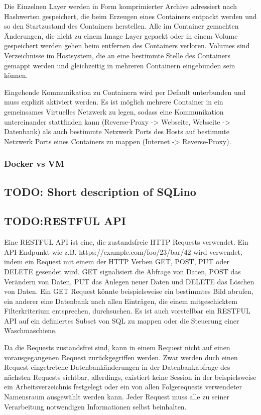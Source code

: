 Die Einzelnen Layer werden in Form komprimierter Archive adressiert nach
Hashwerten gespeichert, die beim Erzeugen eines Containers entpackt werden und
so den Startzustand des Containers herstellen. Alle im Container gemachten
Änderungen, die nicht zu einem Image Layer gepackt oder in einem Volume
gespeichert werden gehen beim entfernen des Containers verloren. Volumes sind
Verzeichnisse im Hostsystem, die an eine bestimmte Stelle des Containers gemappt
werden und gleichzeitig in mehreren Containern eingebunden sein können.

Eingehende Kommunikation zu Containern wird per Default unterbunden und muss
explizit aktiviert werden. Es ist möglich mehrere Container in ein
gemeinsames Virtuelles Netzwerk zu legen, sodass eine Kommunikation
untereinander stattfinden kann (Reverse-Proxy -> Webseite, Webseite ->
Datenbank) als auch bestimmte Netzwerk Ports des Hosts auf bestimmte Netzwerk
Ports eines Containers zu mappen (Internet -> Reverse-Proxy).

\subsubsection{Docker vs VM}



\subsection{TODO: Short description of SQLino}



\subsection{TODO:RESTFUL API}
Eine RESTFUL API ist eine, die zustandsfreie HTTP Requests verwendet. Ein API
Endpunkt wie z.B. https://example.com/foo/23/bar/42 wird verwendet, indem ein
Request mit einem der HTTP Verben GET, POST, PUT oder DELETE gesendet wird.
GET signalisiert die Abfrage von Daten, POST das Verändern von Daten, PUT
das Anlegen neuer Daten und DELETE das Löschen von Daten. Ein GET Request
könnte beispielsweise ein bestimmtes Bild abrufen, ein anderer eine
Datenbank nach allen Einträgen, die einem mitgeschicktem Filterkriterium
entsprechen, durchsuchen. Es ist auch vorstellbar ein RESTFUL API auf ein
definiertes Subset von SQL zu mappen oder die Steuerung einer Waschmaschiene.

Da die Requests zustandsfrei sind, kann in einem Request nicht auf einen
vorausgegangenen Request zurückgegriffen werden. Zwar werden duch einen
Request eingetretene Datenbankänderungen in der Datenbankabfrage des
nächsten Requests sichtbar, allerdings, existiert keine Session in der
beispielsweise ein Arbeitsverzeichnis festgelegt oder ein von allen
Folgerequests verwendeter Namensraum ausgewählt werden kann. Jeder Request
muss alle zu seiner Verarbeitung notwendigen Informationen selbst beinhalten. 

